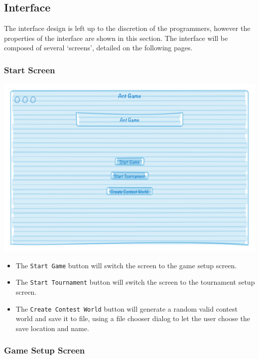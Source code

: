 \documentclass[11pt]{article}
\begin{document}
\newpage
\subsection{Interface}

The interface design is left up to the discretion of the programmers, however the properties of the interface are shown in this section. The interface will be composed of several `screens', detailed on the following pages.

\subsubsection{Start Screen}

\begin{center}
\includegraphics[width=\textwidth]{low-level-diagrams/interface/start-screen}
\end{center}

\begin{itemize}
\item The \texttt{Start Game} button will switch the screen to the game setup screen.
\item The \texttt{Start Tournament} button will switch the screen to the tournament setup screen.
\item The \texttt{Create Contest World} button will generate a random valid contest world and save it to file, using a file chooser dialog to let the user choose the save location and name.
\end{itemize}

\subsubsection{Game Setup Screen}
\end{document}
